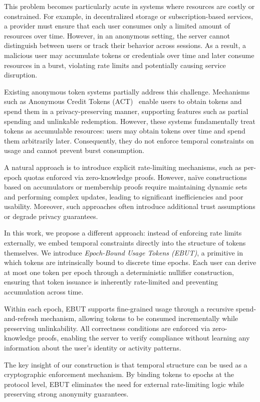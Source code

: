 \documentclass[11pt]{article}
\theoremstyle{definitionstyle}
\theoremstyle{plain}
\begin{document}
This problem becomes particularly acute in systems where resources are costly or constrained. For example, in decentralized storage or subscription-based services, a provider must ensure that each user consumes only a limited amount of resources over time. However, in an anonymous setting, the server cannot distinguish between users or track their behavior across sessions. As a result, a malicious user may accumulate tokens or credentials over time and later consume resources in a burst, violating rate limits and potentially causing service disruption.

Existing anonymous token systems partially address this challenge. Mechanisms such as Anonymous Credit Tokens (ACT)~\cite{act} enable users to obtain tokens and spend them in a privacy-preserving manner, supporting features such as partial spending and unlinkable redemption. However, these systems fundamentally treat tokens as accumulable resources: users may obtain tokens over time and spend them arbitrarily later. Consequently, they do not enforce temporal constraints on usage and cannot prevent burst consumption.

A natural approach is to introduce explicit rate-limiting mechanisms, such as per-epoch quotas enforced via zero-knowledge proofs. However, naïve constructions based on accumulators or membership proofs require maintaining dynamic sets and performing complex updates, leading to significant inefficiencies and poor usability. Moreover, such approaches often introduce additional trust assumptions or degrade privacy guarantees.

In this work, we propose a different approach: instead of enforcing rate limits externally, we embed temporal constraints directly into the structure of tokens themselves. We introduce \emph{Epoch-Bound Usage Tokens (EBUT)}, a primitive in which tokens are intrinsically bound to discrete time epochs. Each user can derive at most one token per epoch through a deterministic nullifier construction, ensuring that token issuance is inherently rate-limited and preventing accumulation across time.

Within each epoch, EBUT supports fine-grained usage through a recursive spend-and-refresh mechanism, allowing tokens to be consumed incrementally while preserving unlinkability. All correctness conditions are enforced via zero-knowledge proofs, enabling the server to verify compliance without learning any information about the user's identity or activity patterns.

The key insight of our construction is that temporal structure can be used as a cryptographic enforcement mechanism. By binding tokens to epochs at the protocol level, EBUT eliminates the need for external rate-limiting logic while preserving strong anonymity guarantees.
\end{document}
